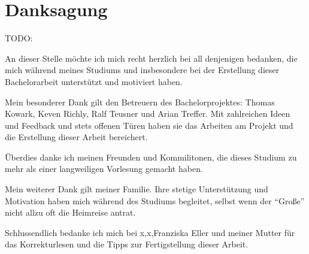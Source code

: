 \section*{Danksagung}
TODO:

An dieser Stelle möchte ich mich recht herzlich bei all denjenigen bedanken, die mich während meines Studiums und insbesondere bei der Erstellung dieser Bachelorarbeit unterstützt und motiviert haben. 

Mein besonderer Dank gilt den Betreuern des Bachelorprojektes: Thomas Kowark, Keven Richly, Ralf Teusner und Arian Treffer.
Mit zahlreichen Ideen und Feedback und stets offenen Türen haben sie das Arbeiten am Projekt und die Erstellung dieser Arbeit bereichert.

Überdies danke ich meinen Freunden und Kommilitonen, die dieses Studium zu mehr als einer langweiligen Vorlesung gemacht haben.

Mein weiterer Dank gilt meiner Familie. Ihre stetige Unterstützung und Motivation haben mich während des Studiums begleitet, selbst wenn der ``Große'' nicht allzu oft die Heimreise antrat.

Schlussendlich bedanke ich mich bei x,x,Franziska Eller und meiner Mutter für das Korrekturlesen und die Tipps zur Fertigstellung dieser Arbeit.
